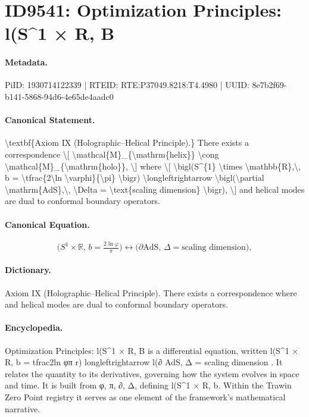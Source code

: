 \section*{ID9541: Optimization Principles: l(S\textasciicircum{}1 × R, B}
\paragraph{Metadata.}
PiID: 1930714122339 | RTEID: RTE:P37049.8218:T4.4980 | UUID: 8e7b2f69-b141-5868-94d6-4e65de4aadc0

\paragraph{Canonical Statement.}
\textbackslash{}textbf\{Axiom IX (Holographic--Helical Principle).\} There exists a correspondence \textbackslash{}[ \textbackslash{}mathcal\{M\}\_\{\textbackslash{}mathrm\{helix\}\} \textbackslash{}cong \textbackslash{}mathcal\{M\}\_\{\textbackslash{}mathrm\{holo\}\}, \textbackslash{}] where \textbackslash{}[ \textbackslash{}bigl(S\textasciicircum{}\{1\} \textbackslash{}times \textbackslash{}mathbb\{R\},\textbackslash{}, b = \textbackslash{}tfrac\{2\textbackslash{}ln \textbackslash{}varphi\}\{\textbackslash{}pi\} \textbackslash{}bigr) \textbackslash{}longleftrightarrow \textbackslash{}bigl(\textbackslash{}partial \textbackslash{}mathrm\{AdS\},\textbackslash{}, \textbackslash{}Delta = \textbackslash{}text\{scaling dimension\} \textbackslash{}bigr), \textbackslash{}] and helical modes are dual to conformal boundary operators.

\paragraph{Canonical Equation.}
\[
\bigl(S^{1} \times \mathbb{R},\, b = \tfrac{2\ln \varphi}{\pi} \bigr) \longleftrightarrow \bigl(\partial \mathrm{AdS},\, \Delta = \text{scaling dimension} \bigr),
\]

\paragraph{Dictionary.}
Axiom IX (Holographic--Helical Principle). There exists a correspondence where and helical modes are dual to conformal boundary operators.

\paragraph{Encyclopedia.}
Optimization Principles: l(S\textasciicircum{}1 × R, B is a differential equation, written l(S\textasciicircum{}1 × R, b = tfrac2ln φπ r) longleftrightarrow l(∂ AdS, Δ = scaling dimension . It relates the quantity to its derivatives, governing how the system evolves in space and time. It is built from φ, π, ∂, Δ, defining l(S\textasciicircum{}1 × R, b. Within the Trawin Zero Point registry it serves as one element of the framework's mathematical narrative.
